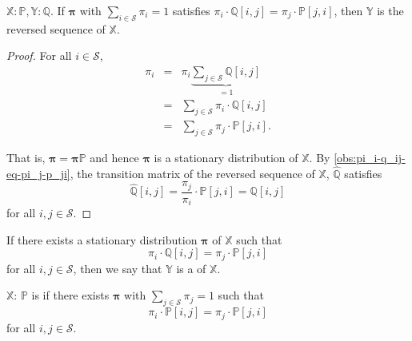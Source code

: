 \begin{observation}
$ \mathbb{X}: \mathbb{P}, \mathbb{Y}: \mathbb{Q} $.
If $ \boldsymbol\pi $ with $ \sum_{i \in \mathcal{S}} \pi_{i} = 1 $ satisfies $ \pi_{i} \cdot \mathbb{Q}[i, j] = \pi_{j} \cdot \mathbb{P}[j, i] $, then $ \mathbb{Y} $ is the reversed sequence of $ \mathbb{X} $.
\begin{proof}
For all $ i \in \mathcal{S} $,
\begin{eqnarray*}
\pi_{i}
  & = & \pi_{i} \underbrace{\sum_{j \in \mathcal{S}} \mathbb{Q}[i, j]}_{= 1} \\
  & = & \sum_{j \in \mathcal{S}} \pi_{i} \cdot \mathbb{Q}[i, j] \\
  & = & \sum_{j \in \mathcal{S}} \pi_{j} \cdot \mathbb{P}[j, i].
\end{eqnarray*}

That is, $ \boldsymbol\pi = \boldsymbol\pi \mathbb{P} $ and hence $ \boldsymbol\pi $ is a stationary distribution of $ \mathbb{X} $. By \autoref{obs:pi_i-q_ij-eq-pi_j-p_ji}, the transition matrix of the reversed sequence of $ \mathbb{X} $, $ \hat{\mathbb{Q}} $ satisfies
  \[ \hat{\mathbb{Q}}[i, j] = \frac{\pi_{j}}{\pi_i} \cdot \mathbb{P}[j, i] = \mathbb{Q}[i, j] \]
for all $ i, j \in \mathcal{S} $.
\end{proof}
\end{observation}

\begin{definition}
If there exists a stationary distribution $ \boldsymbol\pi $ of $ \mathbb{X} $ such that
\[ \pi_{i} \cdot \mathbb{Q}[i, j] = \pi_{j} \cdot \mathbb{P}[j, i] \]
for all $ i, j \in \mathcal{S} $,
then we say that $ \mathbb{Y} $ is a  of $ \mathbb{X} $.
\end{definition}

\begin{definition}
$ \mathbb{X} $: $ \mathbb{P} $ is  if there exists $ \boldsymbol\pi $ with $ \sum_{j \in \mathcal{S}} \pi_{j} = 1 $ such that
\[ \pi_{i} \cdot \mathbb{P}[i, j] = \pi_{j} \cdot \mathbb{P}[j, i] \]
for all $ i, j \in \mathcal{S} $.
\end{definition}

